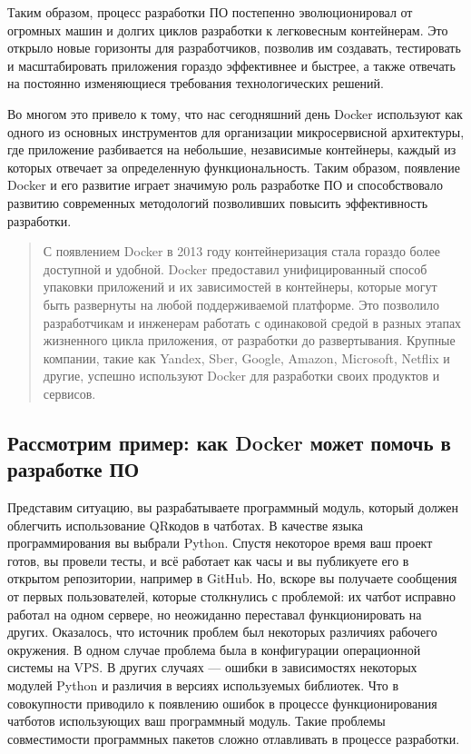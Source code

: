 \documentclass[letterpaper,10pt,russian]{sphinxmanual}
\begin{document}
\sphinxAtStartPar
Таким образом, процесс разработки ПО постепенно эволюционировал от огромных машин и долгих циклов разработки к легковесным контейнерам. Это открыло новые горизонты для разработчиков, позволив им создавать, тестировать и масштабировать приложения гораздо эффективнее и быстрее, а также отвечать на постоянно изменяющиеся требования технологических решений.

\sphinxAtStartPar
Во многом это привело к тому, что нас сегодняшний день Docker используют как одного из основных инструментов для организации микросервисной архитектуры, где приложение разбивается на небольшие, независимые контейнеры, каждый из которых отвечает за определенную функциональность. Таким образом, появление Docker и его развитие играет значимую роль разработке ПО и способствовало развитию современных методологий позволивших повысить эффективность разработки.
\begin{quote}

\sphinxAtStartPar
С появлением Docker в 2013 году контейнеризация стала гораздо более доступной и удобной. Docker предоставил унифицированный способ упаковки приложений и их зависимостей в контейнеры, которые могут быть развернуты на любой поддерживаемой платформе. Это позволило разработчикам и инженерам работать с одинаковой средой в разных этапах жизненного цикла приложения, от разработки до развертывания. Крупные компании, такие как Yandex, Sber, Google, Amazon, Microsoft, Netflix и другие, успешно используют Docker для разработки своих продуктов и сервисов.
\end{quote}


\subsection{Рассмотрим пример: как Docker может помочь в разработке ПО}
\label{\detokenize{educational_materials/docker_base/content:id2}}
\sphinxAtStartPar
Представим ситуацию, вы разрабатываете программный модуль, который должен облегчить использование QR\sphinxhyphen{}кодов в чат\sphinxhyphen{}ботах. В качестве языка программирования вы выбрали Python. Спустя некоторое время ваш проект готов, вы провели тесты, и всё работает как часы и вы публикуете его в открытом репозитории, например в GitHub. Но, вскоре вы получаете сообщения от первых пользователей, которые столкнулись с проблемой: их чат\sphinxhyphen{}бот исправно работал на одном сервере, но неожиданно переставал функционировать на других. Оказалось, что источник проблем был некоторых различиях рабочего окружения. В одном случае проблема была в конфигурации операционной системы на VPS. В других случаях — ошибки в зависимостях некоторых модулей Python и различия в версиях используемых библиотек. Что в совокупности приводило к появлению ошибок в процессе функционирования чат\sphinxhyphen{}ботов использующих ваш программный модуль. Такие проблемы совместимости программных пакетов сложно отлавливать в процессе разработки.
\end{document}
